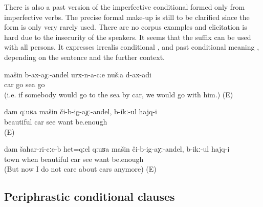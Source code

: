 There is also a past version of the imperfective conditional formed only from imperfective verbs. The precise formal make-up is still to be clarified since the form is only very rarely used. There are no corpus examples and elicitation is hard due to the insecurity of the speakers. It seems that the suffix  can be used with all persons. It expresses irrealis conditional ,  and past conditional meaning , depending on the sentence and the further context.
%
\begin{exe}
	\ex	\label{ex:‎‎‎If a car would go to the sea, we would go.}
	\gll	mašin	b-ax-aχː-andel	urx-n-a-cːe	nušːa	d-ax-adi\\
		car	go	sea		go\\
	\glt	{} (i.e. if somebody would go to the sea by car, we would go with him.) (E) 

	\ex	\label{ex:If I would see a nice car, I would want it.}
	\gll	dam	qːuʁa	mašin	či-b-ig-aχː-andel,	b-ikː-ul	hajq-i\\
			beautiful	car	see	want	be.enough\\
	\glt	{}  (E)

	\ex	\label{ex:At that time when I saw a nice car in the city, I wanted it.}
	\gll	dam	šahar-ri-cːe-b	het=qːel qːuʁa	mašin	či-b-ig-aχː-andel,	b-ikː-ul	hajq-i\\
			town when beautiful	car	see	want	be.enough\\
	\glt	{} (But now I do not care about cars anymore) (E)
\end{exe}



\subsection{Periphrastic conditional clauses}
\label{sec:periphrasticconditionalclauses}

